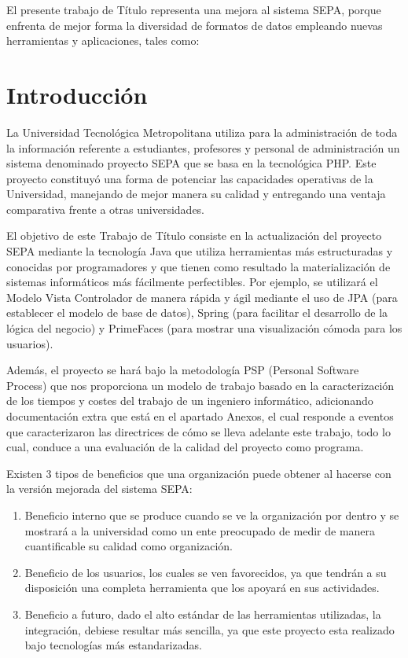 \documentclass[a4paper,12pt,openany,oneside]{book}
\begin{document}
El presente trabajo de Título representa una mejora al sistema SEPA, porque enfrenta de mejor forma la diversidad de formatos de datos empleando nuevas herramientas y aplicaciones, tales como: 


\tableofcontents
\listoffigures
\chapter*{Introducción}
\thispagestyle{empty}
La Universidad Tecnológica Metropolitana utiliza para la administración de toda la información referente a estudiantes, profesores y personal de administración un sistema denominado proyecto SEPA que se basa en la tecnológica PHP. Este proyecto constituyó una forma de potenciar las capacidades operativas de la Universidad, manejando de mejor manera su calidad y entregando una ventaja comparativa frente a otras universidades.

El objetivo de este Trabajo de Título consiste en la actualización del proyecto SEPA mediante la tecnología Java que utiliza herramientas más estructuradas y conocidas por programadores y que tienen como resultado la materialización de sistemas informáticos más fácilmente perfectibles. Por ejemplo, se utilizará el Modelo Vista Controlador de manera rápida y ágil mediante el uso de JPA (para establecer el modelo de base de datos), Spring (para facilitar el desarrollo de la lógica del negocio) y PrimeFaces (para mostrar una visualización cómoda para los usuarios). 

Además, el proyecto se hará bajo la metodología PSP (Personal Software Process) que nos proporciona un modelo de trabajo basado en la caracterización de los tiempos y costes del trabajo de un ingeniero informático, adicionando documentación extra que está en el apartado Anexos, el cual responde a eventos que caracterizaron las directrices de cómo se lleva adelante este trabajo, todo lo cual, conduce a una evaluación de la calidad del proyecto como programa.

Existen 3 tipos de beneficios que una organización puede obtener al hacerse con la versión mejorada del sistema SEPA:

\begin{enumerate}
\item Beneficio interno que se produce cuando se ve la organización por dentro y se mostrará a la universidad como un ente preocupado de medir de manera cuantificable su calidad como organización.

\item Beneficio de los usuarios, los cuales se ven favorecidos, ya que tendrán a su disposición una completa herramienta que los apoyará en sus actividades.

\item Beneficio a futuro, dado el alto estándar de las herramientas utilizadas, la integración, debiese resultar más sencilla, ya que este proyecto esta realizado bajo tecnologías más estandarizadas.
\end{enumerate}
\end{document}
